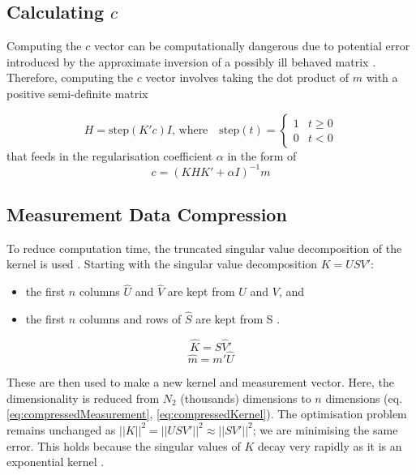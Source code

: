 \subsection{Calculating $c$}
    Computing the $c$ vector can be computationally dangerous due to potential error introduced by the approximate inversion of a possibly ill behaved matrix \cite{BulterReedsDawsonMethod1981}. Therefore, computing the $c$ vector involves taking the dot product of $m$ with a positive semi-definite matrix 
 
\begin{equation}
    H = \text{step}(K'c)I \text{, where} \quad \text{step}(t) = 
    \begin{cases}
    1  & t \geq 0\\
    0  & t < 0
    \end{cases}
    \label{eq:makeSemiPostiveDefinite}
\end{equation}   
that feeds in the regularisation coefficient \cite{BulterReedsDawsonMethod1981} $\alpha$ in the form of
\begin{equation}
    c =  (KHK' + \alpha I)^{-1} m  
    \label{eq:optFindC}
\end{equation} 


\subsection{Measurement Data Compression} \label{section:compression}
To reduce computation time, the truncated singular value decomposition of the kernel is used \cite{Venk2DFredholm2002}. Starting with the singular value decomposition $K = U S V'$:
\begin{itemize}
    \item the first $n$ columns $\hat{U}$ and $\hat{V}$ are kept from $U$ and $V$, and
    \item the first $n$ columns and rows of $\hat{S}$ are kept from S \cite{TSVDHansen1987truncatedsvd}.
\end{itemize}

\begin{equation}
    \hat{K} = \hat{S} \hat{V}'
    \label{eq:compressedKernel}
\end{equation}
\begin{equation}
    \hat{m} = m' \hat{U}
    \label{eq:compressedMeasurement}    
\end{equation}

These are then used to make a new kernel and measurement vector. Here, the dimensionality is reduced from $N_2$ (thousands) dimensions to $n$ dimensions   (eq. \ref{eq:compressedMeasurement}, \ref{eq:compressedKernel}). The optimisation problem remains unchanged as $||K||^2 = ||USV'||^2 \approx ||SV'||^2$; we are minimising the same error. This holds because the singular values of $K$ decay very rapidly as it is an exponential kernel \cite{NumericalInversionLaplaceTransform1978}.



